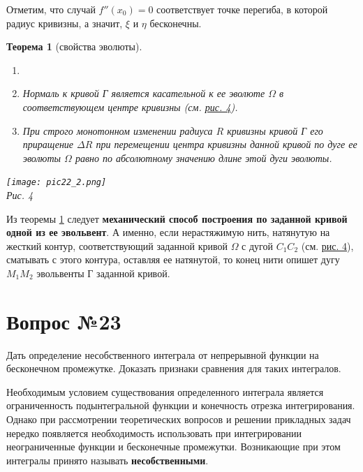 \documentclass[12pt]{report}
\numberwithin{equation}{section}
\newtheorem{theorem}{Теорема}[section]
\begin{document}
Отметим, что случай $f''(x_0) = 0$ соответствует точке перегиба, в которой радиус кривизны, а значит, $\xi$ и $\eta$ бесконечны.

\begin{theorem}[свойства эволюты] \label{th:22:3}
\begin{enumerate}
\item[]
\item[(1)] Нормаль к кривой Г является касательной к ее эволюте $\Omega$ в соответствующем центре кривизны (см. \hyperref[pic:22:2]{рис. 4}).
\item[(2)] При строго монотонном изменении радиуса $R$ кривизны кривой Г его приращение $\Delta R$ при перемещении центра кривизны данной кривой по дуге ее эволюты $\Omega$ равно по абсолютному значению длине этой дуги эволюты.
\end{enumerate}
\begin{center}
\texttt{[image: pic22\_2.png]} \label{pic:22:2}\\
Рис. 4
\end{center}
\end{theorem}

Из теоремы \ref{th:22:3} следует \textbf{механический способ построения по заданной кривой одной из ее эвольвент}. А именно, если нерастяжимую нить, натянутую на жесткий контур, соответствующий заданной кривой $\Omega$ с дугой $C_1 C_2$ (см. \hyperref[pic:22:2]{рис. 4}), сматывать с этого контура, оставляя ее натянутой, то конец нити опишет дугу $M_1 M_2$ эвольвенты Г заданной кривой.

\newpage \section{Вопрос №23} %
\begin{framed}
Дать определение несобственного интеграла от непрерывной функции на бесконечном промежутке. Доказать признаки сравнения для таких интегралов.
\end{framed}

Необходимым условием существования определенного интеграла является ограниченность подынтегральной функции и конечность отрезка интегрирования. Однако при рассмотрении теоретических вопросов и решении прикладных задач нередко появляется необходимость использовать при интегрировании неограниченные функции и бесконечные промежутки. Возникающие при этом интегралы принято называть \textbf{несобственными}.\\
\end{document}
